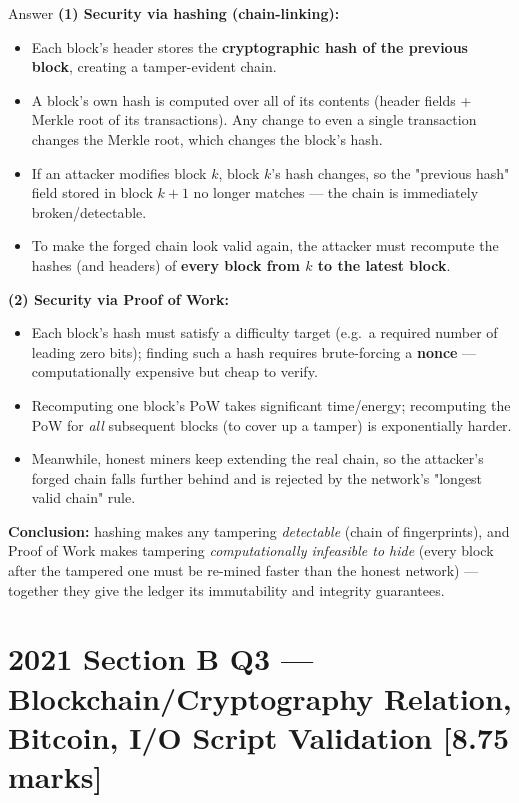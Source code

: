 \documentclass[12pt,a4paper]{article}
\begin{document}
\begin{solbox}{Answer}
\textbf{(1) Security via hashing (chain-linking):}
\begin{itemize}[noitemsep]
  \item Each block's header stores the \textbf{cryptographic hash of the previous block}, creating a tamper-evident chain.
  \item A block's own hash is computed over all of its contents (header fields + Merkle root of its transactions). Any change to even a single transaction changes the Merkle root, which changes the block's hash.
  \item If an attacker modifies block $k$, block $k$'s hash changes, so the "previous hash" field stored in block $k+1$ no longer matches --- the chain is immediately broken/detectable.
  \item To make the forged chain look valid again, the attacker must recompute the hashes (and headers) of \textbf{every block from $k$ to the latest block}.
\end{itemize}

\textbf{(2) Security via Proof of Work:}
\begin{itemize}[noitemsep]
  \item Each block's hash must satisfy a difficulty target (e.g.\ a required number of leading zero bits); finding such a hash requires brute-forcing a \textbf{nonce} --- computationally expensive but cheap to verify.
  \item Recomputing one block's PoW takes significant time/energy; recomputing the PoW for \emph{all} subsequent blocks (to cover up a tamper) is exponentially harder.
  \item Meanwhile, honest miners keep extending the real chain, so the attacker's forged chain falls further behind and is rejected by the network's "longest valid chain" rule.
\end{itemize}

\textbf{Conclusion:} hashing makes any tampering \emph{detectable} (chain of fingerprints), and Proof of Work makes tampering \emph{computationally infeasible to hide} (every block after the tampered one must be re-mined faster than the honest network) --- together they give the ledger its immutability and integrity guarantees.
\end{solbox}

\section{2021 Section B Q3 --- Blockchain/Cryptography Relation, Bitcoin, I/O Script Validation [8.75 marks]}
\end{document}
